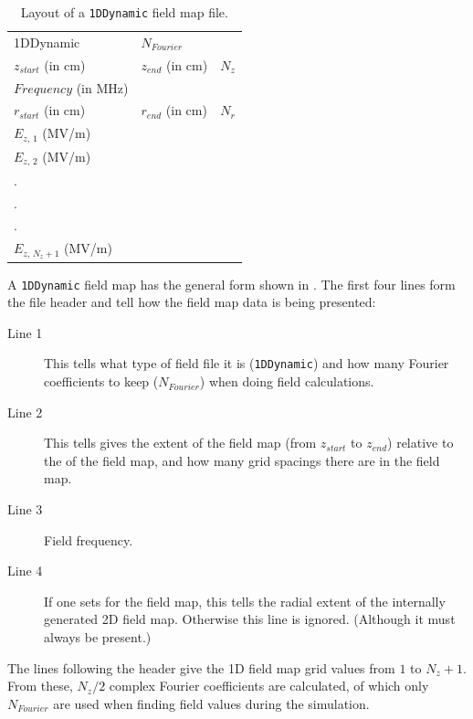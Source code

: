 \begin{table}[h!]
    \caption{Layout of a \texttt{1DDynamic} field map file.}
    \label{tab:1DDynamic}
    \begin{center}
    \begin{tabular}{lll}
      \hline
      1DDynamic & $N_{Fourier}$ & \\
      $z_{start}$ (in cm) & $z_{end}$ (in cm) & $N_{z}$ \\
      $Frequency$ (in MHz)& & \\
      $r_{start}$ (in cm) & $r_{end}$ (in cm) & $N_{r}$ \\
      $E_{z,\,1}$ (MV/m) & & \\
      $E_{z,\,2}$ (MV/m) & & \\
      . & & \\
      . & & \\
      . & & \\
      $E_{z,\,N_{z} + 1}$ (MV/m) & & \\
      \hline
    \end{tabular}
    \end{center}
\end{table}

A \texttt{1DDynamic} field map has the general form shown in . The first four lines form
the file header and tell \opalt how the field map data is being presented:

\begin{description}
\item[Line 1] This tells \opalt what type of field file it is (\texttt{1DDynamic}) and how many Fourier coefficients to
  keep ($N_{Fourier}$) when doing field calculations.
\item[Line 2] This tells gives the extent of the field map (from $z_{start}$ to $z_{end}$) relative to the  of
  the field map, and how many grid spacings there are in the field map.
\item[Line 3] Field frequency.
\item[Line 4] If one sets  for the field map, this tells \opalt the radial extent of the internally
  generated 2D field map. Otherwise this line is ignored. (Although it must always be present.)
\end{description}

The lines following the header give the 1D field map grid values from $1$ to $N_{z} + 1$. From these, $N_{z}/2$
complex Fourier coefficients are calculated, of which only $N_{Fourier}$ are used when finding field values during the
simulation.

